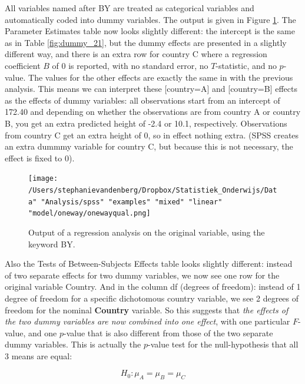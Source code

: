 \documentclass[]{report}\usepackage[]{graphicx}\usepackage[]{color}
\begin{document}
All variables named after BY are treated as categorical variables and automatically coded into dummy variables. The output is given in Figure \ref{fig:dummy_22}. The Parameter Estimates table now looks slightly different: the intercept is the same as in Table \ref{fig:dummy_21}, but the dummy effects are presented in a slightly different way, and there is an extra row for country C where a regression coefficient $B$ of 0 is reported, with no standard error, no $T$-statistic, and no $p$-value. The values for the other effects are exactly the same in with the previous analysis. This means we can interpret these [country=A] and [country=B] effects as the effects of dummy variables: all observations start from an intercept of 172.40 and depending on whether the observations are from country A or country B, you get an extra predicted height of -2.4 or 10.1, respectively. Observations from country C get an extra height of 0, so in effect nothing extra. (SPSS creates an extra dummmy variable for country C, but because this is not necessary, the effect is fixed to 0).

\begin{figure}[h]
    \begin{center}
       \texttt{[image: /Users/stephanievandenberg/Dropbox/Statistiek\_Onderwijs/Data" "Analysis/spss" "examples" "mixed" "linear" "model/oneway/onewayqual.png]}
    \end{center}
    \caption{Output of a regression analysis on the original variable, using the keyword BY.}
    \label{fig:dummy_22}
\end{figure}



Also the Tests of Between-Subjects Effects table looks slightly different: instead of two separate effects for two dummy variables, we now see one row for the original variable Country. And in the column df (degrees of freedom): instead of 1 degree of freedom for a specific dichotomous country variable, we see 2 degrees of freedom for the nominal \textbf{Country} variable. So this suggests that \textit{the effects of the two dummy variables are now combined into one effect}, with one particular $F$-value, and one $p$-value that is also different from those of the two separate dummy variables. This is actually the $p$-value test for the null-hypothesis that all 3 means are equal: 

\begin{equation}
H_0: \mu_A= \mu_B=\mu_C
\end{equation}
\end{document}
